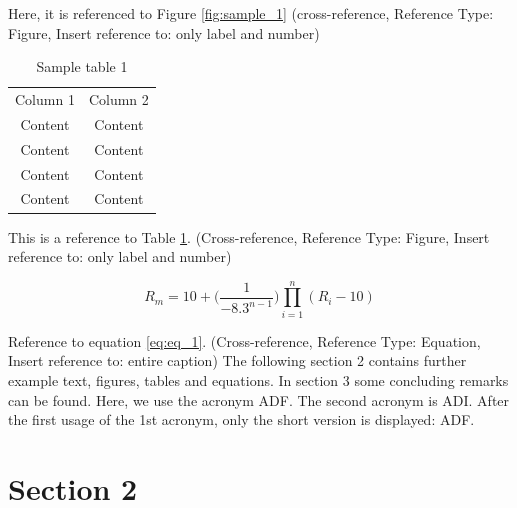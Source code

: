 \documentclass[11pt, a4paper, twoside]{report}
\renewcommand{\chaptermark}[1]{\markboth{\MakeUppercase{\ \thechapter. \ #1}}{}}
\begin{document}
Here, it is referenced to Figure \ref{fig:sample_1} (cross-reference, Reference Type: Figure, Insert reference to: only label and number)

\begin{table}[H]
  \centering
  \begin{tabular}{c c} 
    Column 1 & Column 2  \\ [0.5ex] 
    Content & Content \\ 
    Content & Content \\
    Content & Content \\
    Content & Content \\ [1ex] 
  \end{tabular}
  \captionsetup{font=bf, belowskip=-0.5cm}
  \caption[Sample table 1]{Sample table 1}
  \label{table:tab_1}
\end{table}

This is a reference to Table \ref{table:tab_1}. (Cross-reference, Reference Type: Figure, Insert reference to: only label and number)

\begin{equation}
	R_m = 10 + \Big(\frac{1}{-8.3^{n-1}}\Big) \displaystyle\prod_{i=1}^{n} (R_i-10)
	\label{eq:eq_1}
\end{equation}

Reference to equation \ref{eq:eq_1}. (Cross-reference, Reference Type: Equation, Insert reference to: entire caption) 
The following section 2 contains further example text, figures, tables and equations. In section 3 some concluding remarks can be found. Here, we use the acronym \ac{ADF}. The second acronym is \ac{ADI}. After the first usage of the 1st acronym, only the short version is displayed: \ac{ADF}.

\chapter{Section 2} \label{sec:section_2}

\thispagestyle{fancy}
\chaptermark{Section 2}
\end{document}

